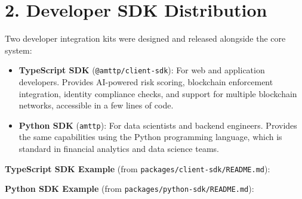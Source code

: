 \documentclass[11pt,a4paper]{article}
\begin{document}
\section*{2. Developer SDK Distribution}
Two developer integration kits were designed and released alongside the core system:
\begin{itemize}
    \item \textbf{TypeScript SDK} (\texttt{@amttp/client-sdk}): For web and application developers. Provides AI-powered risk scoring, blockchain enforcement integration, identity compliance checks, and support for multiple blockchain networks, accessible in a few lines of code.
    \item \textbf{Python SDK} (\texttt{amttp}): For data scientists and backend engineers. Provides the same capabilities using the Python programming language, which is standard in financial analytics and data science teams.
\end{itemize}

\vspace{0.3cm}
\noindent\textbf{TypeScript SDK Example} (from \texttt{packages/client-sdk/README.md}):

\vspace{0.2cm}
\noindent{}

\vspace{0.3cm}
\noindent\textbf{Python SDK Example} (from \texttt{packages/python-sdk/README.md}):
\end{document}
